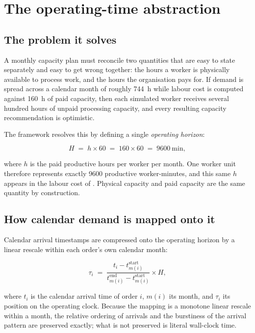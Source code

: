 \section{The operating-time abstraction}
\label{sec:operating-time}

\subsection{The problem it solves}

A monthly capacity plan must reconcile two quantities that are easy to state separately and
easy to get wrong together: the hours a worker is physically available to process work, and
the hours the organisation pays for. If demand is spread across a calendar month of roughly
\SI{744}{\hour} while labour cost is computed against \SI{160}{\hour} of paid capacity, then
each simulated worker receives several hundred hours of unpaid processing capacity, and every
resulting capacity recommendation is optimistic.

The framework resolves this by defining a single \emph{operating horizon}:

\begin{equation}
H \;=\; h \times 60 \;=\; 160 \times 60 \;=\; \SI{9600}{\minute},
\label{eq:horizon}
\end{equation}

\noindent where \(h\) is the paid productive hours per worker per month. One worker unit
therefore represents exactly \SI{9600}{} productive worker-minutes, and this same \(h\) appears
in the labour cost of . Physical capacity and paid capacity are the same quantity
by construction.

\subsection{How calendar demand is mapped onto it}

Calendar arrival timestamps are compressed onto the operating horizon by a linear rescale
within each order's own calendar month:

\begin{equation}
\tau_i \;=\; \frac{t_i - t^{\text{start}}_{m(i)}}
                  {t^{\text{end}}_{m(i)} - t^{\text{start}}_{m(i)}} \times H,
\label{eq:compression}
\end{equation}

\noindent where \(t_i\) is the calendar arrival time of order \(i\), \(m(i)\) its month, and
\(\tau_i\) its position on the operating clock. Because the mapping is a monotone linear
rescale within a month, the relative ordering of arrivals and the burstiness of the arrival
pattern are preserved exactly; what is not preserved is literal wall-clock time.

